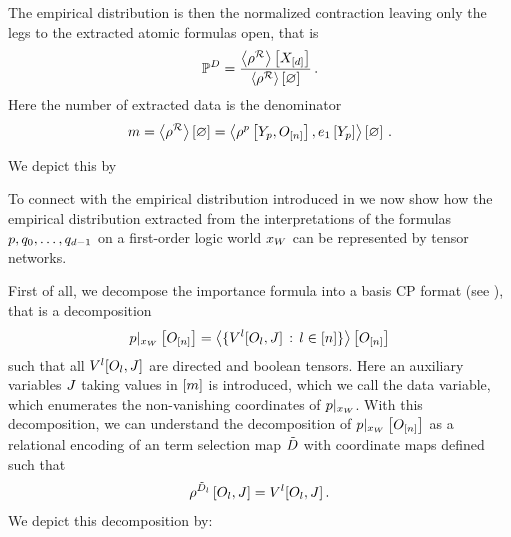 The empirical distribution is then the normalized contraction leaving only the legs to the extracted atomic formulas open, that is
\begin{align*}
    \mathbb{P}^{D}
    = \frac{
        \left\langle \rho^{\mathcal{R}}\right\rangle \left[ X_{[d]} \right]
    }{
        \left\langle \rho^{\mathcal{R}}\right\rangle \left[ \varnothing \right]
    }  \, .
\end{align*}
Here the number of extracted data is the denominator
\begin{align*}
    m
    = \left\langle \rho^{\mathcal{R}}\right\rangle \left[ \varnothing \right]
    = \left\langle \rho^{p}\left[Y_{p},O_{[n]}\right],e_1\left[Y_{p}\right]\right\rangle \left[ \varnothing \right]\, .
\end{align*}

We depict this by
\begin{center}
    
\end{center}





To connect with the empirical distribution introduced in  we now show how the empirical distribution extracted from the interpretations of the formulas $p,q_{0},\ldots,q_{d-1}$ on a first-order logic world $x_{W}$ can be represented by tensor networks.

First of all, we decompose the importance formula into a basis CP format (see ), that is a decomposition
\begin{align*}
    {p}|_{x_{W}} \left[O_{[n]}\right]
    = \left\langle 
        \{V^{l}[O_{l},J] \, : \, l\in[n] \}
    \right\rangle \left[ O_{[n]} \right]
\end{align*}
such that all $V^{l}[O_{l},J]$ are directed and boolean tensors.
Here an auxiliary variables $J$ taking values in $[m]$ is introduced, which we call the data variable, which enumerates the non-vanishing coordinates of ${p}|_{x_{W}}$.
With this decomposition, we can understand the decomposition of ${p}|_{x_{W}} \left[O_{[n]}\right]$ as a relational encoding of an term selection map $\tilde{D}$ with coordinate maps defined such that
\begin{align*}
    \rho^{\tilde{D}_{l}}\left[O_{l},J\right]
    = V^{l}[O_{l},J] \, .
\end{align*}
We depict this decomposition by:
\begin{center}
    
\end{center}

